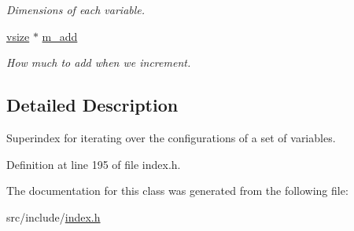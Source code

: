 \begin{DoxyCompactItemize}
\begin{DoxyCompactList}\small\item\em Dimensions of each variable. \end{DoxyCompactList}\item 
\hyperlink{classmerlin_1_1superindex_a4e63d0617c6b351c664cdfd406686d62}{vsize} $\ast$ \hyperlink{classmerlin_1_1superindex_aa08c306e701cafaa61e4719737d9615d}{m\+\_\+add}\hypertarget{classmerlin_1_1superindex_aa08c306e701cafaa61e4719737d9615d}{}\label{classmerlin_1_1superindex_aa08c306e701cafaa61e4719737d9615d}

\begin{DoxyCompactList}\small\item\em How much to add when we increment. \end{DoxyCompactList}\end{DoxyCompactItemize}


\subsection{Detailed Description}
Superindex for iterating over the configurations of a set of variables. 

Definition at line 195 of file index.\+h.



The documentation for this class was generated from the following file\+:\begin{DoxyCompactItemize}
\item 
src/include/\hyperlink{index_8h}{index.\+h}\end{DoxyCompactItemize}
